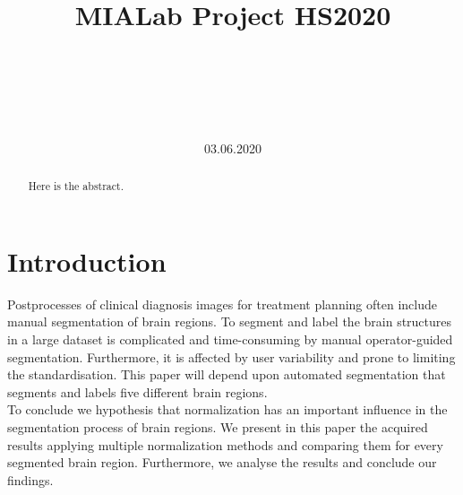 \documentclass[conference]{IEEEtran}
\begin{document}

\title{MIALab Project HS2020}


\author{
\\
\and
{}
\\
\and
{}
\\
}
\date{03.06.2020}

\maketitle
\pagestyle{plain}
\newpage



\begin{abstract}
Here is the abstract.


\end{abstract}




\section{Introduction}

	Postprocesses of clinical diagnosis images for treatment planning often include manual segmentation of brain regions. 
	To segment and label the brain structures in a large dataset is complicated and time-consuming by manual operator-guided segmentation. 
	Furthermore, it is affected by user variability and prone to limiting the standardisation. 
	This paper will depend upon automated segmentation that segments and labels five different brain regions. \\


	To conclude we hypothesis that normalization has an important influence in the segmentation process of brain regions. 
	We present in this paper the acquired results applying multiple normalization methods and comparing them for every segmented brain region. 
	Furthermore, we analyse the results and conclude our findings. \\
\end{document}
